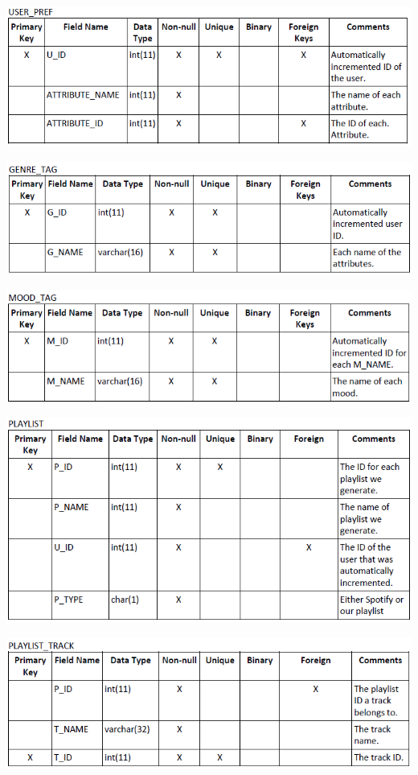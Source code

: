 \documentclass[letter, 11pt]{article}
\begin{document}
\includegraphics[scale=0.85,left]{er_tables/user_pref.PNG}

\includegraphics[scale=0.85,left]{er_tables/genre_tag.PNG}

\includegraphics[scale=0.85,left]{er_tables/mood_tag.PNG}

\includegraphics[scale=0.85,left]{er_tables/playlist.PNG}

\includegraphics[scale=0.85,left]{er_tables/playlist_track.PNG}
\end{document}
